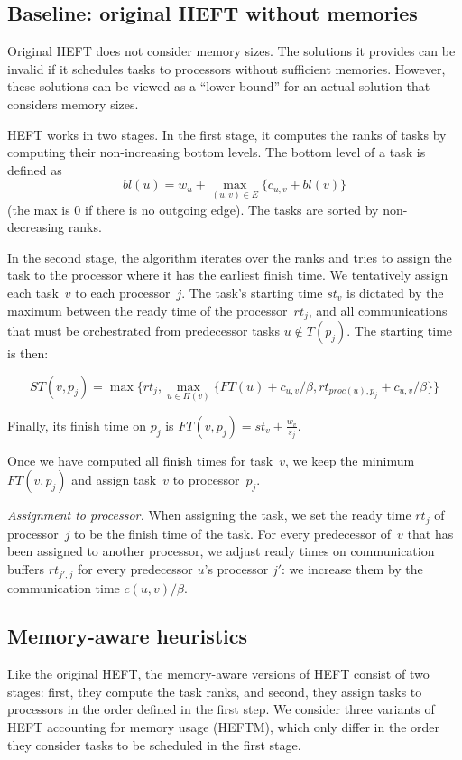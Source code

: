 \documentclass[conference]{IEEEtran}
\begin{document}
    \subsection{Baseline: original HEFT without memories}
\label{sec.heft}

    Original HEFT does not consider memory sizes.
    The solutions it provides can be invalid if it schedules tasks to processors without sufficient memories.
    However, these solutions can be viewed as a ``lower bound'' for an actual solution that considers memory sizes.

    HEFT works in two stages.
    In the first stage, it computes the ranks of tasks by computing their non-increasing bottom levels.
    The bottom level of a task is defined as
    $$bl(u) = w_u + \max_{(u,v)\in E} \{c_{u,v} + bl(v)\}$$
    (the max is 0 if there is no outgoing edge).
    The tasks are sorted by non-decreasing ranks.

    In the second stage, the algorithm iterates over the ranks and tries to assign the task to the processor where it
    has the earliest finish time.
    We tentatively assign each task~$v$ to each processor~$j$.
    The task's starting time $st_v$ is dictated by the maximum between the ready time of the processor~$rt_j$,
    and all communications that
    must be orchestrated from predecessor tasks $u\notin T(p_j)$.
    The starting time is then:

 {\footnotesize{   \[ST(v, p_j) = \max{ \{rt_j, \max_{ u \in \Pi(v)}\{ FT(u)+ c_{u,v} / \beta , rt_{proc(u), p_j} + c_{u,v} / \beta  \} \} } \]}}

    Finally, its finish time on $p_j$ is
    $FT(v,p_j) = st_v + \frac{w_v}{s_j}$.

    Once we have computed all finish times for task~$v$,
    we keep the minimum $FT(v,p_j)$ and assign task~$v$
    to processor~$p_j$.

    \textit{Assignment to processor. }
    When assigning the task, we set the ready time $rt_j$ of  processor~$j$ to be the finish time of the task.
    For every predecessor of~$v$ that has been assigned to another processor, we adjust ready times on
    communication buffers $rt_{j', j}$ for every predecessor $u$'s processor $j'$: we increase them by the
    communication time $c( u,v) / \beta$.

    \subsection{Memory-aware heuristics}
    \label{sec.heftm}
    Like the original HEFT, the memory-aware versions of HEFT consist of two stages:
    first, they compute the task ranks,
    and second, they assign tasks to processors in the order defined in the first step.
    We consider three variants of HEFT accounting for memory usage (HEFTM), which only
    differ in the order they consider tasks to be scheduled in the first stage.
\end{document}
